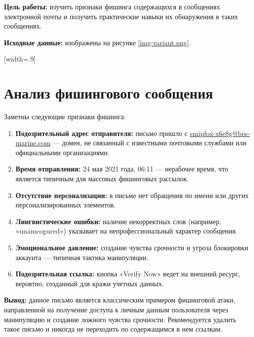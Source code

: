 \documentclass{bsuir}
\begin{document}
\maketitle
\mainmatter

\textbf{Цель работы:} изучить признаки фишинга содержащихся в сообщениях электронной почты и
получить практические навыки их обнаружения в таких сообщениях.

\textbf{Исходные данные:} изображены на рисунке \ref{img:variant.png}.

[width=.9\textwidth]

\section{Анализ фишингового сообщения}

Заметны следующие признаки фишинга:

\begin{enumerate}
	\item \textbf{Подозрительный адрес отправителя:} письмо пришло с \url{smipfox-x6e8g@bes-marine.com} — домен, не связанный с известными почтовыми службами или официальными организациями.

	\item \textbf{Время отправления:} 24 мая 2021 года, 06:11 — нерабочее время, что является типичным для массовых фишинговых рассылок.

	\item \textbf{Отсутствие персонализации:} в письме нет обращения по имени или других персонализированных элементов.

	\item \textbf{Лингвистические ошибки:} наличие некорректных слов (например, «unamcogured») указывает на непрофессиональный характер сообщения.

	\item \textbf{Эмоциональное давление:} создание чувства срочности и угроза блокировки аккаунта — типичная тактика манипуляции.

	\item \textbf{Подозрительная ссылка:} кнопка «Verify Now» ведет на внешний ресурс, вероятно, созданный для кражи учетных данных.
\end{enumerate}

\textbf{Вывод:} данное письмо является классическим примером фишинговой атаки, направленной на получение доступа к личным данным пользователя через манипуляцию и создание ложного чувства срочности. Рекомендуется удалить такое письмо и никогда не переходить по содержащимся в нем ссылкам.
\end{document}
